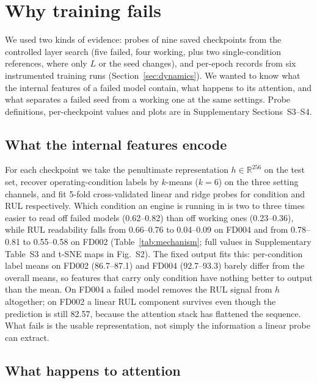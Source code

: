 \section{Why training fails}
\label{sec:mechanism}

We used two kinds of evidence: probes of nine saved checkpoints from the
controlled layer search (five failed, four working, plus two
single-condition references, where only $L$ or the seed changes), and
per-epoch records from six instrumented training runs
(Section~\ref{sec:dynamics}). We wanted to know what the internal features
of a failed model contain, what happens to its attention, and what separates
a failed seed from a working one at the same settings. Probe definitions,
per-checkpoint values and plots are in Supplementary Sections~S3--S4.

\subsection{What the internal features encode}
\label{sec:h1}

For each checkpoint we take the penultimate representation
$h\in\mathbb{R}^{256}$ on the test set, recover operating-condition labels by
$k$-means ($k{=}6$) on the three setting channels, and fit 5-fold
cross-validated linear and ridge probes for condition and RUL respectively.
Which condition an engine is running in is two to three times easier to read
off failed models (0.62--0.82) than off working ones (0.23--0.36), while RUL
readability falls from 0.66--0.76 to 0.04--0.09 on FD004 and from 0.78--0.81
to 0.55--0.58 on FD002 (Table~\ref{tab:mechanism}; full values in
Supplementary Table~S3 and t-SNE maps in Fig.~S2). The fixed output fits
this: per-condition label means on FD002 (86.7--87.1) and FD004 (92.7--93.3)
barely differ from the overall means, so features that carry only condition
have nothing better to output than the mean. On FD004 a failed model removes
the RUL signal from $h$ altogether; on FD002 a linear RUL component survives
even though the prediction is still 82.57, because the attention stack has
flattened the sequence. What fails is the usable representation, not simply
the information a linear probe can extract.

\subsection{What happens to attention}
\label{sec:h2}

